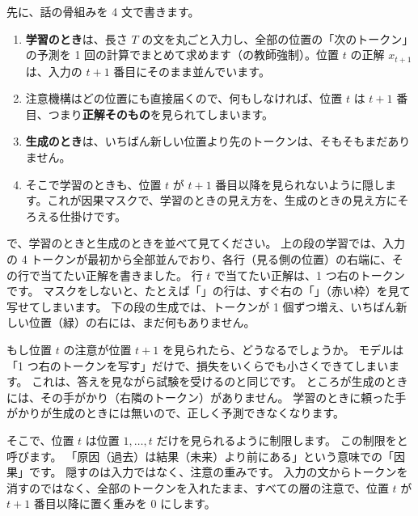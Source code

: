 先に、話の骨組みを 4 文で書きます。
\begin{enumerate}
\item \textbf{学習のとき}は、長さ $T$ の文を丸ごと入力し、全部の位置の「次のトークン」の予測を 1 回の計算でまとめて求めます（の教師強制）。位置 $t$ の正解 $x_{t+1}$ は、入力の $t+1$ 番目にそのまま並んでいます。
\item 注意機構はどの位置にも直接届くので、何もしなければ、位置 $t$ は $t+1$ 番目、つまり\textbf{正解そのもの}を見られてしまいます。
\item \textbf{生成のとき}は、いちばん新しい位置より先のトークンは、そもそもまだありません。
\item そこで学習のときも、位置 $t$ が $t+1$ 番目以降を見られないように隠します。これが因果マスクで、学習のときの見え方を、生成のときの見え方にそろえる仕掛けです。
\end{enumerate}

で、学習のときと生成のときを並べて見てください。
上の段の学習では、入力の 4 トークンが最初から全部並んでおり、各行（見る側の位置）の右端に、その行で当てたい正解を書きました。
行 $t$ で当てたい正解は、1 つ右のトークンです。
マスクをしないと、たとえば「」の行は、すぐ右の「」（赤い枠）を見て写せてしまいます。
下の段の生成では、トークンが 1 個ずつ増え、いちばん新しい位置（緑）の右には、まだ何もありません。

もし位置 $t$ の注意が位置 $t+1$ を見られたら、どうなるでしょうか。
モデルは「1 つ右のトークンを写す」だけで、損失をいくらでも小さくできてしまいます。
これは、答えを見ながら試験を受けるのと同じです。
ところが生成のときには、その手がかり（右隣のトークン）がありません。
学習のときに頼った手がかりが生成のときには無いので、正しく予測できなくなります。

そこで、位置 $t$ は位置 $1,\dots,t$ だけを見られるように制限します。
この制限をと呼びます。
「原因（過去）は結果（未来）より前にある」という意味での「因果」です。
隠すのは入力ではなく、注意の重みです。
入力の文からトークンを消すのではなく、全部のトークンを入れたまま、すべての層の注意で、位置 $t$ が $t+1$ 番目以降に置く重みを 0 にします。

